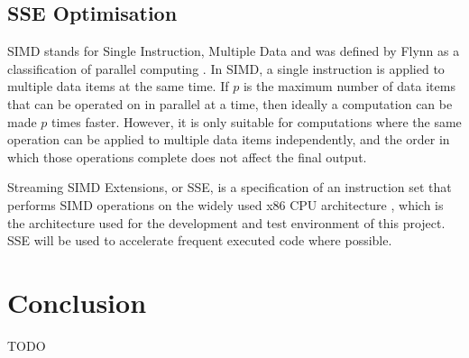 \subsection{SSE Optimisation}
\label{sec:sse}

SIMD stands for Single Instruction, Multiple Data and was defined by Flynn as a classification of parallel computing \cite{flynns-taxonomy}. In SIMD, a single instruction is applied to multiple data items at the same time. If $p$ is the maximum number of data items that can be operated on in parallel at a time, then ideally a computation can be made $p$ times faster. However, it is only suitable for computations where the same operation can be applied to multiple data items independently, and the order in which those operations complete does not affect the final output.

Streaming SIMD Extensions, or SSE, is a specification of an instruction set that performs SIMD operations on the widely used x86 CPU architecture \cite{sse}, which is the architecture used for the development and test environment of this project. SSE will be used to accelerate frequent executed code where possible.

\section{Conclusion}

TODO